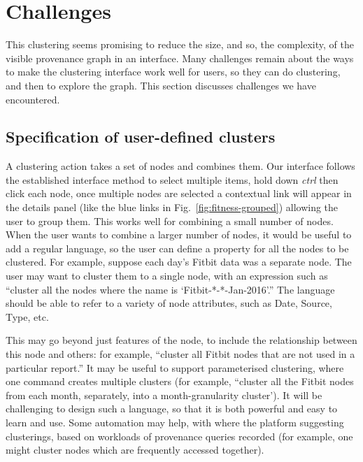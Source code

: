\chapter{Challenges}

This clustering seems promising to reduce the size, and so, the complexity, of the visible provenance graph 
in an interface.
Many challenges remain about the ways to make the clustering interface work well for users, 
so they can do clustering, and then to explore the graph. This section discusses challenges we have encountered.

\section{Specification of user-defined clusters}
\label{sub:introduction_to_clustering}

A clustering action takes a set of nodes and combines them. 
Our interface follows the established interface method to select multiple items,
hold down \textit{ctrl} then click each node, once multiple nodes are selected a contextual link will appear in the details panel (like the blue links in Fig.~\ref{fig:fitness-grouped}) allowing the user to group them. 
This works well for combining a small number of nodes. 
When the user wants to combine a larger number of nodes, 
it would be useful to add a regular language, 
so the user can define a property for all the nodes to be clustered.
For example, suppose each day's Fitbit data was a separate node.
The user may want to cluster them to a single node,
with an expression such as ``cluster all the nodes where the name is `Fitbit-*-*-Jan-2016'.'' 
The language should be able to refer to a variety of node attributes, such as Date, Source, Type, etc.

This may go beyond just features of the node, to include the relationship between this node and others: 
for example, ``cluster all Fitbit nodes that are not used in a particular report.'' 
It may be useful to support parameterised clustering, 
where one command creates multiple clusters 
(for example, ``cluster all the Fitbit nodes from each month, separately, into a month-granularity cluster'). 
It will be challenging to design such a language, so that it is both powerful and easy to learn and use.
%
Some automation may help, with where the platform suggesting clusterings, based on workloads of provenance queries recorded (for example, one might cluster nodes which are frequently accessed together).

